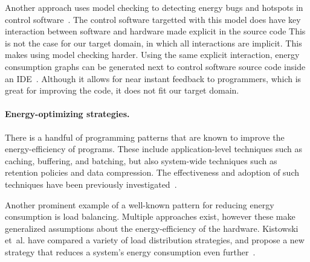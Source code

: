Another approach uses model checking to detecting energy bugs and hotspots in control
software~\cite{symbolic-energy-bugs}. The control software targetted with this model does have key
interaction between software and hardware made explicit in the source code This is not the case for
our target domain, in which all interactions are implicit. This makes using model checking harder.
Using the same explicit interaction, energy consumption graphs can be generated next to control
software source code inside an IDE~\cite{symbolic-skylines}. Although it allows for near instant
feedback to programmers, which is great for improving the code, it does not fit our target domain.

\paragraph{Energy-optimizing strategies.}
There is a handful of programming patterns that are known to improve the energy-efficiency of
programs. These include applica\-tion-level techniques such as caching, buffering, and batching, but
also system-wide techniques such as retention policies and data compression. The effectiveness and
adoption of such techniques have been previously
investigated~\cite{strategies-hpc,strategies-industry}.

Another prominent example of a well-known pattern for reducing energy consumption is load balancing.
Multiple approaches exist, however these make generalized assumptions about the energy-efficiency of
the hardware. Kistowski et~al. have compared a variety of load distribution strategies, and propose
a new strategy that reduces a system's energy consumption even
further~\cite{strategies-load-distribution}.
